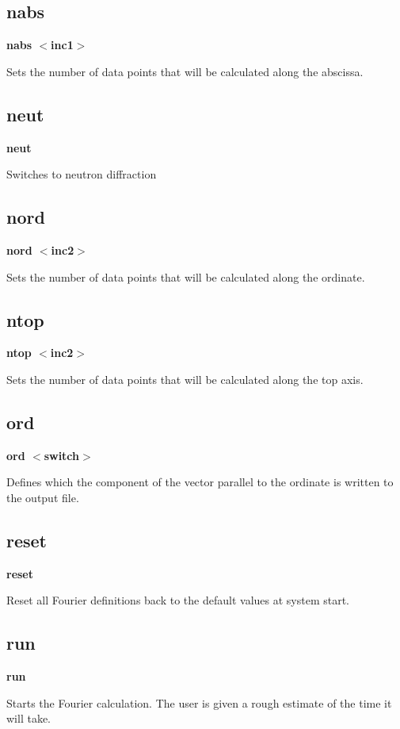 \subsection*{nabs}
{\bf nabs $ <$inc1$> $ \par }
\par
\vspace{3pt}
Sets the number of data points that will be calculated along the 
abscissa. 
\subsection*{neut}
{\bf neut \par }
\par
\vspace{3pt}
Switches to neutron diffraction 
\subsection*{nord}
{\bf nord $ <$inc2$> $ \par }
\par
\vspace{3pt}
Sets the number of data points that will be calculated along the 
ordinate. 
\subsection*{ntop}
{\bf ntop $ <$inc2$> $ \par }
\par
\vspace{3pt}
Sets the number of data points that will be calculated along the 
top axis. 
\subsection*{ord}
{\bf ord $ <$switch$> $ \par }
\par
\vspace{3pt}
Defines which the component of the vector parallel to the ordinate 
is written to the output file. 
\subsection*{reset}
{\bf reset \par }
\par
\vspace{3pt}
Reset all Fourier definitions back to the default values at 
system start. 
\subsection*{run}
{\bf run \par }
\par
\vspace{3pt}
Starts the Fourier calculation. The user is given a rough 
estimate of the time it will take. 
